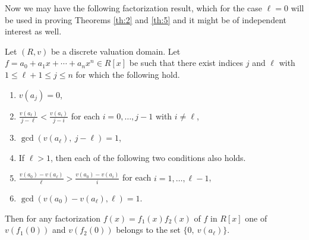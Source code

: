 \documentclass[12pt]{amsart}%
\begin{document}
Now we may have the following factorization result, which for the case $\ell=0$ will be used in proving Theorems \ref{th:2} and \ref{th:5} and it might be of independent interest as well.
\begin{lemma}\label{L:2}
Let $(R,v)$  be a discrete valuation domain. Let $f=a_0 + a_1x + \cdots + a_nx^n \in {R}[x]$ be such that there exist indices  $j$ and $\ell$ with $1\leq \ell+1\leq j\leq n$ for which the following hold.
\begin{enumerate}[label=$(\roman*)$]
\item $v(a_j)=0$,
\item $\frac{v(a_\ell)}{j-\ell}<\frac{v(a_i)}{j-i}$ for each $i=0,\ldots, j-1$ with $i\neq \ell$,
\item $\gcd(v(a_\ell),~j-\ell) = 1$,
\item[]If $\ell>1$, then each of the following two conditions also holds.
\item  $\frac{v(a_0)-v(a_\ell)}{\ell}>\frac{v(a_0)-v(a_i)}{i}$ for each $i=1,\ldots, \ell-1$,
\item  $\gcd(v(a_0)-v(a_\ell),\ell)=1$.
\end{enumerate}
Then for any factorization $f(x)=f_1(x)f_2(x)$ of $f$ in $R[x]$ one of $v(f_1(0))$ and $v(f_2(0))$ belongs to the set $\{0,~v(a_\ell)\}$.
\end{lemma}
\end{document}
